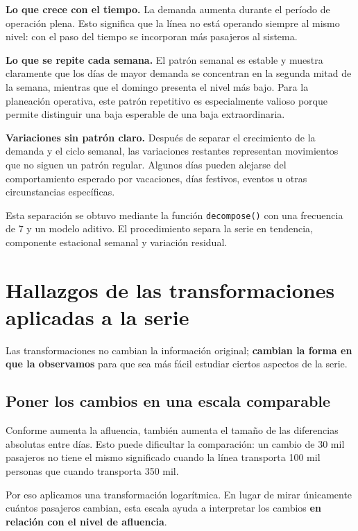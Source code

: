 \documentclass[
  12pt,
  titlepage]{article}
\begin{document}
\textbf{Lo que crece con el tiempo.} La demanda aumenta durante el período de operación plena. Esto significa que la línea no está operando siempre al mismo nivel: con el paso del tiempo se incorporan más pasajeros al sistema.

\textbf{Lo que se repite cada semana.} El patrón semanal es estable y muestra claramente que los días de mayor demanda se concentran en la segunda mitad de la semana, mientras que el domingo presenta el nivel más bajo. Para la planeación operativa, este patrón repetitivo es especialmente valioso porque permite distinguir una baja esperable de una baja extraordinaria.

\textbf{Variaciones sin patrón claro.} Después de separar el crecimiento de la demanda y el ciclo semanal, las variaciones restantes representan movimientos que no siguen un patrón regular. Algunos días pueden alejarse del comportamiento esperado por vacaciones, días festivos, eventos u otras circunstancias específicas.

\begin{notatecnica}
Esta separación se obtuvo mediante la función
\texttt{decompose()} con una frecuencia de 7 y un modelo aditivo. El procedimiento separa la serie en tendencia, componente estacional semanal y variación residual.
\end{notatecnica}

\section{Hallazgos de las transformaciones aplicadas a la serie}\label{hallazgos-de-las-transformaciones-aplicadas-a-la-serie}

Las transformaciones no cambian la información original; \textbf{cambian la forma en que la observamos} para que sea más fácil estudiar ciertos aspectos de la serie.

\subsection{Poner los cambios en una escala comparable}\label{poner-los-cambios-en-una-escala-comparable}

Conforme aumenta la afluencia, también aumenta el tamaño de las diferencias absolutas entre días. Esto puede dificultar la comparación: un cambio de 30 mil pasajeros no tiene el mismo significado cuando la línea transporta 100 mil personas que cuando transporta 350 mil.

Por eso aplicamos una transformación logarítmica. En lugar de mirar únicamente cuántos pasajeros cambian, esta escala ayuda a interpretar los cambios \textbf{en relación con el nivel de afluencia}.
\end{document}
